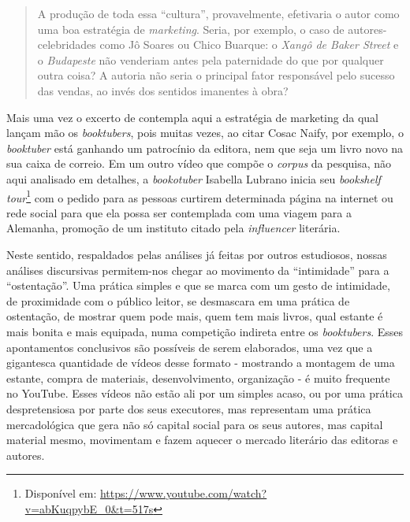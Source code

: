 \begin{quote}
A produção de toda essa \enquote{cultura}, provavelmente, efetivaria o autor
como uma boa estratégia de \textit{marketing}. Seria, por exemplo, o caso
de autores-celebridades como Jô Soares ou Chico Buarque: o \textit{Xangô
de Baker Street} e o \textit{Budapeste} não venderiam antes pela
paternidade do que por qualquer outra coisa? A autoria não seria o
principal fator responsável pelo sucesso das vendas, ao invés dos
sentidos imanentes à obra? \cite[p. 53]{galinari2005autorialidade}
\end{quote}

Mais uma vez o excerto de \textcite{galinari2005autorialidade} contempla aqui a estratégia de  marketing da qual lançam mão os \textit{booktubers}, pois muitas vezes, ao citar Cosac Naify, por exemplo, o \textit{booktuber} está ganhando um
patrocínio da editora, nem que seja um livro novo na sua caixa de
correio. Em um outro vídeo que compõe o \textit{corpus} da pesquisa, não
aqui analisado em detalhes, a \textit{bookotuber} Isabella Lubrano inicia
seu \textit{bookshelf tour}\footnote{Disponível em:
  \url{https://www.youtube.com/watch?v=abKuqpybE\_0\&t=517s}} com o pedido
para as pessoas curtirem determinada página na internet ou rede social
para que ela possa ser contemplada com uma viagem para a Alemanha,
promoção de um instituto citado pela \textit{influencer} literária.

Neste sentido, respaldados pelas análises já feitas por outros
estudiosos, nossas análises discursivas permitem-nos chegar ao movimento
da \enquote{intimidade} para a \enquote{ostentação}. Uma prática simples e que se marca com um gesto de intimidade, de proximidade com o público leitor,
se desmascara em uma prática de ostentação, de mostrar quem pode mais,
quem tem mais livros, qual estante é mais bonita e mais equipada, numa
competição indireta entre os \textit{booktubers}. Esses apontamentos
conclusivos são possíveis de serem elaborados, uma vez que a gigantesca
quantidade de vídeos desse formato - mostrando a montagem de uma
estante, compra de materiais, desenvolvimento, organização - é muito
frequente no YouTube. Esses vídeos não estão ali por um simples acaso,
ou por uma prática despretensiosa por parte dos seus executores, mas
representam uma prática mercadológica que gera não só capital social
para os seus autores, mas capital material mesmo, movimentam e fazem
aquecer o mercado literário das editoras e autores.

